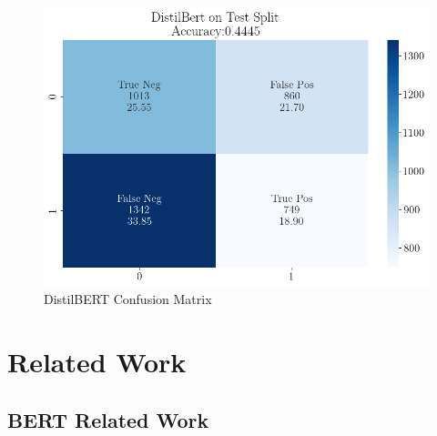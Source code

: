 \documentclass[11pt,a4paper]{article}
\begin{document}
\begin{figure}
  \centering
  \includegraphics[width=\columnwidth]{distil.png}
  \caption{DistilBERT Confusion Matrix}
  \label{fig:distil}
\end{figure}

\section{Related Work}

\subsection{BERT Related Work}
\vspace{.5em}
\end{document}
